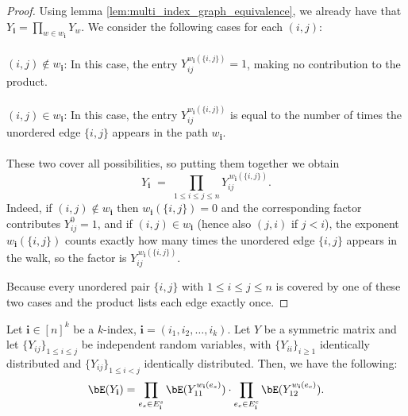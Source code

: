 \begin{proof}
  Using lemma \ref{lem:multi_index_graph_equivalence}, we already have that $Y_{\mathbf{i}} = \prod_{w \in w_{\mathbf{i}}} Y_{w}$. We consider the following cases for each $(i, j)$:\\\\
  \textbf{$(i, j) \notin w_{\mathbf{i}}$}: In this case, the entry $Y_{ij}^{w_{\mathbf{i}}(\{i, j\})} = 1$, making no contribution to the product. \\\\
  \textbf{$(i, j) \in w_{\mathbf{i}}$}: In this case, the entry $Y_{ij}^{w_{\mathbf{i}}(\{i, j\})}$ is equal to the number of times the unordered edge $\{i, j\}$ appears in the path $w_{\mathbf{i}}$. \\\\
  These two cover all possibilities, so putting them together we obtain
  $$
  Y_{\mathbf i}
        \;=\;
        \prod_{1\le i\le j\le n}
            Y_{ij}^{\,w_{\mathbf i}(\{i,j\})}.
  $$
  Indeed, if $(i,j)\notin w_{\mathbf i}$ then $w_{\mathbf i}(\{i,j\})=0$ and the corresponding factor contributes $Y_{ij}^{0}=1$, and if $(i,j)\in w_{\mathbf i}$ (hence also $(j,i)$ if $j<i$), the exponent $w_{\mathbf i}(\{i,j\})$ counts exactly how many times the unordered edge $\{i,j\}$ appears in the walk, so the factor is $Y_{ij}^{\,w_{\mathbf i}(\{i,j\})}$.

  Because every unordered pair $\{i,j\}$ with $1\le i\le j\le n$ is covered by one of these two cases and the product lists each edge exactly once.
\end{proof}

\begin{lemma}
    \label{lem:expectation_matrix_multi_index}
    Let $\mathbf{i} \in[n]^k$ be a $k$-index, $\mathbf{i}=\left(i_1, i_2, \ldots, i_k\right)$. Let $Y$ be a symmetric matrix and let $\{Y_{ij}\}_{1\le i\le j}$ be independent random variables, with $\{Y_{ii}\}_{i\ge 1}$ identically distributed and $\{Y_{ij}\}_{1\le i<j}$ identically distributed. Then, we have the following:
    $$
    \bE(Y_{\mathbf{i}}) = \prod_{e_s \in E_{\mathbf{i}}^s} \bE(Y_{11}^{w_{\mathbf{i}}(e_s)}) \cdot \prod_{e_c \in E_{\mathbf{i}}^c} \bE(Y_{12}^{w_{\mathbf{i}}(e_c)}).
    $$
\end{lemma}

